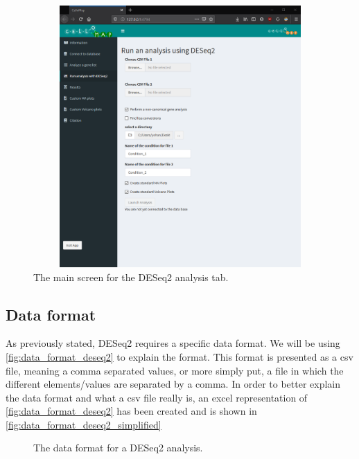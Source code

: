 \documentclass[11pt]{article}
\begin{document}
\begin{figure}[h!]
\centering
\includegraphics[width=15cm,height=10cm,keepaspectratio]{deseq2_screen.png}
\caption{The main screen for the \acrshort{DESeq2} analysis tab.}
\label{fig:deseq2_screen}
\end{figure}

\subsection{Data format \label{deseq2 data_format}}
As previously stated, \acrshort{DESeq2} requires a specific data format. We will be using \autoref{fig:data_format_deseq2} to explain the format.
This format is presented as a \acrshort{csv} file, meaning a comma separated values, or more simply put, a file in which the different elements/values are separated by a comma.
In order to better explain the data format and what a \acrshort{csv} file really is, an excel representation of \autoref{fig:data_format_deseq2} has been created and is shown in \autoref{fig:data_format_deseq2_simplified}

\begin{figure}[h!]
\centering
{}
\caption{The data format for a \acrshort{DESeq2} analysis.}
\label{fig:data_format_deseq2}
\end{figure}
\end{document}
